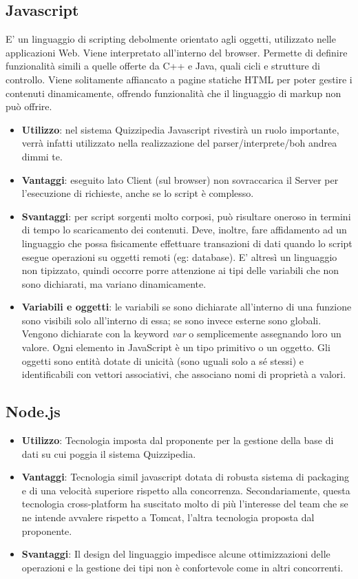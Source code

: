 \documentclass[a4paper,11pt]{article}
\begin{document}
	\subsection{Javascript}
	E' un linguaggio di scripting debolmente orientato agli oggetti, utilizzato nelle applicazioni
Web. Viene interpretato all'interno del browser. Permette di definire funzionalità simili a
quelle offerte da C++ e Java, quali cicli e strutture di controllo.
Viene solitamente affiancato a pagine statiche HTML per poter gestire i contenuti dinamicamente, offrendo funzionalità che il linguaggio di markup non può offrire.
	\begin{itemize}
		\item\textbf{Utilizzo}: nel sistema Quizzipedia Javascript rivestirà un ruolo importante, verrà infatti utilizzato nella realizzazione del parser/interprete/boh andrea dimmi te.
		\item\textbf{Vantaggi}: eseguito lato Client (sul browser) non sovraccarica il Server per l'esecuzione di richieste, anche se lo script è complesso.
		\item\textbf{Svantaggi}: per script sorgenti molto corposi, può risultare oneroso in termini di
tempo lo scaricamento dei contenuti. Deve, inoltre, fare affidamento ad un linguaggio
che possa fisicamente effettuare transazioni di dati quando lo script esegue operazioni
su oggetti remoti (eg: database).
E' altresì un linguaggio non tipizzato, quindi occorre porre attenzione ai tipi delle
variabili che non sono dichiarati, ma variano dinamicamente.
		\item\textbf{Variabili e oggetti}: le variabili se sono dichiarate all'interno di una funzione sono
visibili solo all'interno di essa; se sono invece esterne sono globali. Vengono dichiarate
con la keyword \emph{var} o semplicemente assegnando loro un valore.
Ogni elemento in JavaScript è un tipo primitivo o un oggetto.
Gli oggetti sono entità dotate di unicità (sono uguali solo a sé stessi) e identificabili
con vettori associativi, che associano nomi di proprietà a valori.
	\end{itemize}
	\subsection{Node.js}
	\begin{itemize}
		\item\textbf{Utilizzo}: Tecnologia imposta dal proponente per la gestione della base di dati su cui poggia il sistema Quizzipedia.
		\item\textbf{Vantaggi}: Tecnologia simil javascript dotata di robusta sistema di packaging e di una velocità superiore rispetto alla concorrenza. Secondariamente, questa tecnologia cross-platform ha suscitato molto di più l'interesse  del team che se ne intende avvalere rispetto a Tomcat, l'altra tecnologia proposta dal proponente.
		\item\textbf{Svantaggi}: Il design del linguaggio impedisce alcune ottimizzazioni delle operazioni e la gestione dei tipi non è confortevole come in altri concorrenti.
	\end{itemize}
\end{document}
